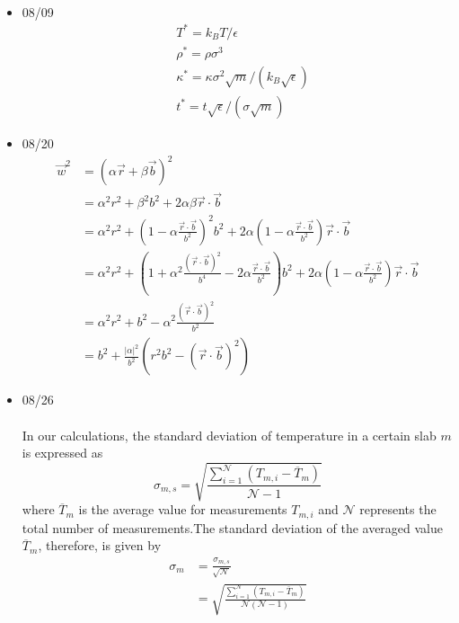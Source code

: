 \documentclass{article}
\author{}
\begin{document}
\paragraph*{}
\begin{itemize}
\item \mbox{08/09}
\begin{align*}
&T^*=k_BT/\epsilon \\
&\rho^*=\rho\sigma^3\\
&\kappa^*=\kappa\sigma^2\sqrt{m}/(k_B\sqrt{\epsilon})\\
&t^*=t\sqrt{\epsilon}/(\sigma\sqrt{m})
\end{align*}
\item \mbox{08/20}
\begin{align*}
\vec{w}^2&=(\alpha\vec{r}+\beta\vec{b})^2 \\
&=\alpha^2r^2+\beta^2b^2+2\alpha\beta\vec{r}\cdot\vec{b}\\
&=\alpha^2r^2+(1-\alpha\frac{\vec{r}\cdot\vec{b}}{b^2})^2b^2+2\alpha(1-\alpha\frac{\vec{r}\cdot\vec{b}}{b^2})\vec{r}\cdot\vec{b}\\
&=\alpha^2r^2+(1+\alpha^2\frac{(\vec{r}\cdot\vec{b})^2}{b^4}-2\alpha\frac{\vec{r}\cdot\vec{b}}{b^2})b^2+2\alpha(1-\alpha\frac{\vec{r}\cdot\vec{b}}{b^2})\vec{r}\cdot\vec{b}\\
&=\alpha^2r^2+b^2-\alpha^2\frac{(\vec{r}\cdot\vec{b})^2}{b^2}\\
&=b^2+\frac{\vert\alpha\vert^2}{b^2}(r^2b^2-(\vec{r}\cdot\vec{b})^2)
\end{align*}
\item 08/26
\paragraph*{}
In our calculations, the standard deviation of temperature in a certain slab $m$ is expressed as
\begin{equation}
\sigma_{m,s}=\sqrt{\frac{\sum\limits_{i=1}^\mathcal{N}\left( T_{m,i}-\overline{T}_m\right)}{\mathcal{N}-1}}
\end{equation}
where $\overline{T}_m$ is the average value for measurements $T_{m,i}$ and $\mathcal{N}$ represents the total number of measurements.The standard deviation of the averaged value $\overline{T}_m$, therefore, is given by
\begin{align}
\sigma_m &=\frac{\sigma_{m,s}}{\sqrt{\mathcal{N}}}\\
&=\sqrt{\frac{\sum\limits_{i=1}^\mathcal{N}\left( T_{m,i}-\overline{T}_m\right)}{\mathcal{N}(\mathcal{N}-1)}}
\end{align}

\end{itemize}
\end{document}
